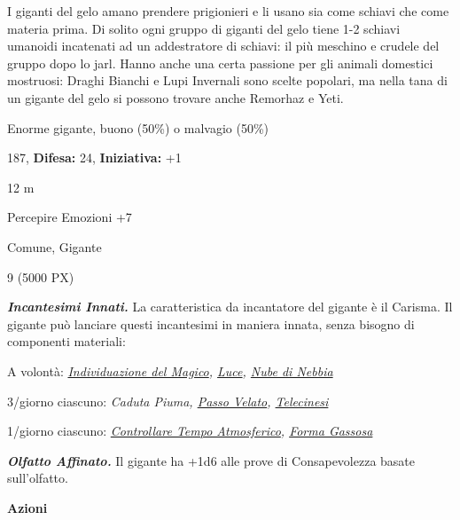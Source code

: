 \begin{multicols}{2}
{I giganti del gelo amano prendere prigionieri e li usano sia come schiavi che come materia prima. Di solito ogni gruppo di giganti del gelo tiene 1-2 schiavi umanoidi incatenati ad un addestratore di schiavi: il più meschino e crudele del gruppo dopo lo jarl. Hanno anche una certa passione per gli animali domestici mostruosi: Draghi Bianchi e Lupi Invernali sono scelte popolari, ma nella tana di un gigante del gelo si possono trovare anche Remorhaz e Yeti.

\noindent
\begin{description}[noitemsep, topsep=0pt, parsep=0pt, partopsep=0pt, leftmargin=0cm, labelwidth=2.2cm]
	\item[\textbf{Taglia/Tipo:}] Enorme gigante, buono (50\%) o malvagio (50\%)
	\item[\textbf{Caratt.:}] 
	\item[\textbf{Punti Ferita:}] 187,  \textbf{Difesa:} 24,  \textbf{Iniziativa:} +1
	\item[\textbf{Movimento:}] 12 m
	\item[\textbf{Tiri Salvez.:}] 
	\item[\textbf{Comp.:}] Percepire Emozioni +7
	\item[\textbf{Linguaggi:}] Comune, Gigante
	\item[\textbf{Sfida:}] 9 (5000 PX)\smallskip
\end{description}

\emph{\textbf{Incantesimi Innati.}} La caratteristica da incantatore del gigante è il Carisma. Il gigante può lanciare questi incantesimi in maniera innata, senza bisogno di componenti materiali:

A volontà: \emph{\hyperlink{Individuazione del Magico}{Individuazione del Magico}, \hyperlink{Luce}{Luce}, \hyperlink{Nube di Nebbia}{Nube di Nebbia}}

3/giorno ciascuno: \emph{Caduta Piuma, \hyperlink{Passo Velato}{Passo Velato}, \hyperlink{Telecinesi}{Telecinesi}}

1/giorno ciascuno: \emph{\hyperlink{Controllare Tempo Atmosferico}{Controllare Tempo Atmosferico}, \hyperlink{Forma Gassosa}{Forma Gassosa}}

\emph{\textbf{Olfatto Affinato.}} Il gigante ha +1d6 alle prove di Consapevolezza basate sull'olfatto.

\textbf{Azioni}

}
\end{multicols}
